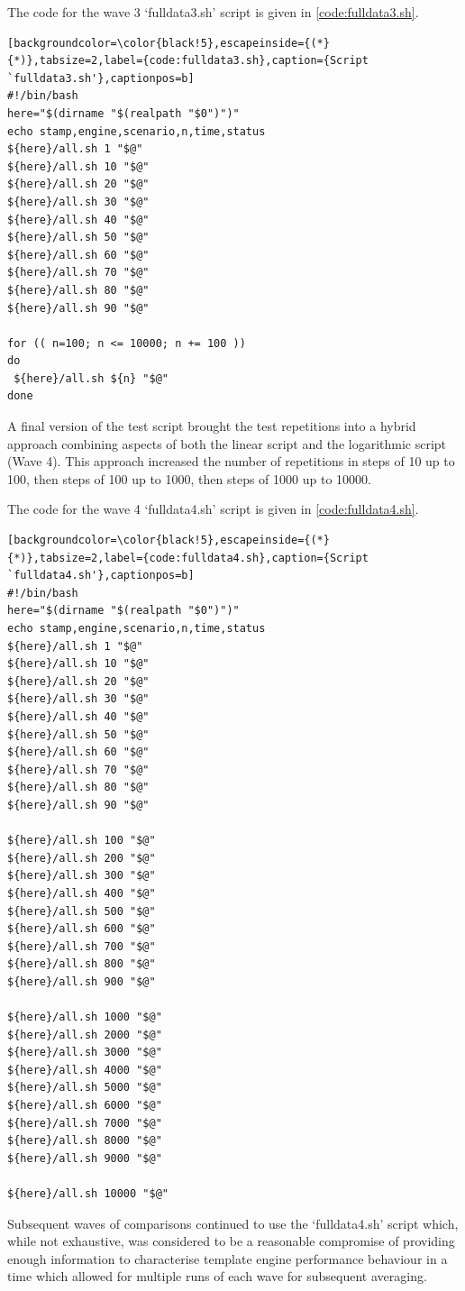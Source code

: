 The code for the wave 3 `fulldata3.sh' script is given in \autoref{code:fulldata3.sh}.

\begin{lstlisting}[backgroundcolor=\color{black!5},escapeinside={(*}{*)},tabsize=2,label={code:fulldata3.sh},caption={Script `fulldata3.sh'},captionpos=b]
#!/bin/bash
here="$(dirname "$(realpath "$0")")"
echo stamp,engine,scenario,n,time,status
${here}/all.sh 1 "$@"
${here}/all.sh 10 "$@"
${here}/all.sh 20 "$@"
${here}/all.sh 30 "$@"
${here}/all.sh 40 "$@"
${here}/all.sh 50 "$@"
${here}/all.sh 60 "$@"
${here}/all.sh 70 "$@"
${here}/all.sh 80 "$@"
${here}/all.sh 90 "$@"

for (( n=100; n <= 10000; n += 100 ))
do
 ${here}/all.sh ${n} "$@"
done
\end{lstlisting}

A final version of the test script brought the test repetitions into a hybrid approach combining aspects of both the linear script and the logarithmic script (Wave 4). This approach increased the number of repetitions in steps of 10 up to 100, then steps of 100 up to 1000, then steps of 1000 up to 10000.

The code for the wave 4 `fulldata4.sh' script is given in \autoref{code:fulldata4.sh}.

\begin{lstlisting}[backgroundcolor=\color{black!5},escapeinside={(*}{*)},tabsize=2,label={code:fulldata4.sh},caption={Script `fulldata4.sh'},captionpos=b]
#!/bin/bash
here="$(dirname "$(realpath "$0")")"
echo stamp,engine,scenario,n,time,status
${here}/all.sh 1 "$@"
${here}/all.sh 10 "$@"
${here}/all.sh 20 "$@"
${here}/all.sh 30 "$@"
${here}/all.sh 40 "$@"
${here}/all.sh 50 "$@"
${here}/all.sh 60 "$@"
${here}/all.sh 70 "$@"
${here}/all.sh 80 "$@"
${here}/all.sh 90 "$@"

${here}/all.sh 100 "$@"
${here}/all.sh 200 "$@"
${here}/all.sh 300 "$@"
${here}/all.sh 400 "$@"
${here}/all.sh 500 "$@"
${here}/all.sh 600 "$@"
${here}/all.sh 700 "$@"
${here}/all.sh 800 "$@"
${here}/all.sh 900 "$@"

${here}/all.sh 1000 "$@"
${here}/all.sh 2000 "$@"
${here}/all.sh 3000 "$@"
${here}/all.sh 4000 "$@"
${here}/all.sh 5000 "$@"
${here}/all.sh 6000 "$@"
${here}/all.sh 7000 "$@"
${here}/all.sh 8000 "$@"
${here}/all.sh 9000 "$@"

${here}/all.sh 10000 "$@"
\end{lstlisting}

Subsequent waves of comparisons continued to use the `fulldata4.sh' script which, while not exhaustive, was considered to be a reasonable compromise of providing enough information to characterise template engine performance behaviour in a time which allowed for multiple runs of each wave for subsequent averaging.


